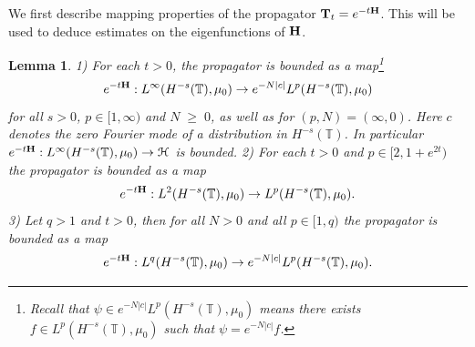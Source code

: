 \documentclass[11pt]{amsart}
\numberwithin{equation}{section}
\newtheorem{lemma}[theorem]{Lemma}
\theoremstyle{definition}
\renewcommand{\geq}{\;\geqslant\;}                   %
\newcommand{\mc}{\mathcal}
\def\T{\mathbb{T}}
\begin{document}
We first describe mapping properties of the propagator ${\bf T}_t=e^{-t{\bf H}}$. This will be used to deduce estimates on the eigenfunctions of ${\bf H}$.
\begin{lemma}\label{LinftyL2}
1) For each $t>0$, the propagator is bounded as a map\footnote{Recall that $\psi \in e^{-N|c|}L^p(H^{-s}(\mathbb T),\mu_0)$ means there exists $f \in L^p(H^{-s}(\mathbb T),\mu_0)$ such that $\psi = e^{-N|c|}f$.}
\[ e^{-t{\bf H}}: L^\infty(H^{-s}(\T),\mu_0)\to e^{-N |c|} L^p(H^{-s}(\T),\mu_0)\]
for all $s>0$, $p\in [1,\infty)$ and $N\geq 0$, as well as for $(p,N)=(\infty,0)$. 
Here $c$ denotes the zero Fourier mode of a distribution in $ H^{-s}(\T)$.
In particular $e^{-t{\bf H}}:L^\infty(H^{-s}(\T),\mu_0)\to \mc{H}$ is bounded.
2) For each $t>0$ and $p\in [2,1+e^{2t})$ the propagator is bounded as a map
\begin{equation}\label{prop_L^2L^p}
e^{-t{\bf H}}: L^2(H^{-s}(\T),\mu_0)\to L^p(H^{-s}(\T),\mu_0).
\end{equation}
3) Let $q>1$ and $t>0$, then for all $N>0$ and all $p\in [1,q)$ the propagator is bounded as a map
\begin{equation}\label{prop_Weighted LpL^q}
e^{-t{\bf H}}: L^q(H^{-s}(\T),\mu_0)\to e^{-N|c|}L^p(H^{-s}(\T),\mu_0).
\end{equation}

\end{lemma}
\end{document}
